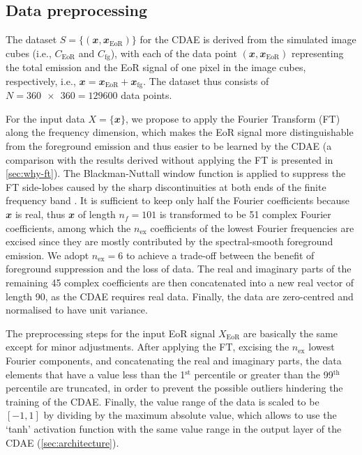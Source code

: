 \documentclass[letters,fleqn,usenatbib,onecolumn]{mnras}
\newcommand{\R}[1]{\mathrm{#1}}
\newcommand{\B}[1]{\mathbfit{#1}}
\begin{document}
\subsection{Data preprocessing}
\label{sec:preprocessing}

{\color{cyan}%
The dataset $S = \{(\B{x}, \B{x}_{\R{EoR}})\}$ for the CDAE is derived
from the simulated image cubes (i.e., $C_{\R{EoR}}$ and $C_{\R{fg}}$),
with each of the data point $(\B{x}, \B{x}_{\R{EoR}})$ representing
the total emission and the EoR signal of one pixel in the image cubes,
respectively, i.e., $\B{x} = \B{x}_{\R{EoR}} + \B{x}_{\R{fg}}$.
The dataset thus consists of $N = \num{360x360} = \num{129600}$ data points.}

For the input data $X = \{\B{x}\}$, we propose to apply the
Fourier Transform (FT) along the frequency dimension,
which makes the EoR signal more distinguishable from the
foreground emission and thus easier to be learned by the CDAE
(a comparison with the results derived without applying the FT is
presented in \autoref{sec:why-ft}).
The Blackman-Nuttall window function is applied to suppress the
FT side-lobes caused by the sharp discontinuities at both ends
of the finite frequency band \citep[e.g.,][]{chapman2016}.
It is sufficient to keep only half the Fourier coefficients because
$\B{x}$ is real, thus $\B{x}$ of length $n_f = 101$ is transformed to
be 51 complex Fourier coefficients,
{\color{cyan}%
among which the $n_{\R{ex}}$
coefficients of the lowest Fourier frequencies are excised since they
are mostly contributed by the spectral-smooth foreground emission.
We adopt $n_{\R{ex}} = 6$ to achieve a trade-off between the benefit of
foreground suppression and the loss of data.
The real and imaginary parts of the remaining 45 complex coefficients
are then concatenated into a new real vector of length 90, as the CDAE
requires real data.}
Finally, the data are zero-centred and normalised to have unit variance.

The preprocessing steps for the input EoR signal $X_{\R{EoR}}$ are
basically the same except for minor adjustments.
After applying the FT, excising the $n_{\R{ex}}$ lowest Fourier
components, and concatenating the real and imaginary parts,
the data elements that have a value less than the 1$^{\R{st}}$
percentile or greater than the 99$^{\R{th}}$ percentile are truncated,
{\color{cyan}%
in order to prevent the possible outliers hindering the training of
the CDAE.
Finally, the value range of the data is scaled to be $[-1, 1]$ by
dividing by the maximum absolute value,
which allows to use the `tanh' activation function with the same value
range in the output layer of the CDAE (\autoref{sec:architecture}).}
\end{document}
